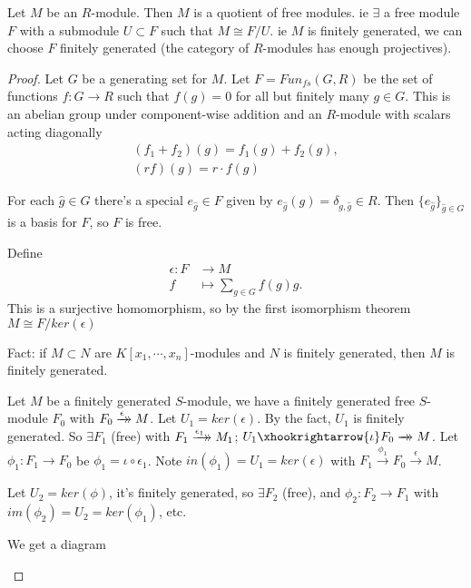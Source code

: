 \begin{proposition}
Let $M $ be an $R$-module. Then $M$ is a quotient of free modules. ie $\exists $ a free module $F$ with a submodule $U \subset F$ such that $M \cong F/U$. ie $M$ is finitely generated, we can choose $F$ finitely generated (the category of $R$-modules has enough projectives).
\end{proposition}

\begin{proof}
Let $G$ be a generating set for $M$. Let $F = Fun_{f s} (G,R)$ be the set of functions $f : G \to R$ such that $f(g) = 0$ for all but finitely many $g \in G$. This is an abelian group under component-wise addition and an $R $-module with scalars acting diagonally
\begin{align*}
    (f_1 + f_2 ) (g) = f_1(g) + f_2(g),\\
    (rf)(g) = r \cdot f(g)
\end{align*}

For each $\hat{g} \in G$ there's a special $e_{\hat{g}} \in F$ given by $e_{\hat{g}} ( g) = \delta_{{g, \hat{g}}} \in R$. Then $\{ e_{\hat{g}} \}_{\hat{g} \in G}$ is a basis for $F$, so $F$ is free.

Define 
\begin{align*}
    \epsilon : F &\to M\\
    f &\mapsto \sum_{g \in G} f(g) g.
\end{align*}
This is a surjective homomorphism, so by the first isomorphism theorem $M \cong F / ker(\epsilon)$

Fact: if $M \subset N$ are $K [ x_1, \cdots, x_n ] $-modules and $N  $ is finitely generated, then $M$ is finitely generated.

Let $M $ be a finitely generated $S$-module, we have a finitely generated free $S$-module $F_0$ with $F_0 \xrightarrow[]{\epsilon}\mathrel{\mkern-14mu}\rightarrow M $. Let $U_1 = ker (\epsilon)$. By the fact, $U_1$ is finitely generated. So $\exists F_1 $ (free) with $F_1 \xrightarrow[]{\epsilon_1}\mathrel{\mkern-14mu}\rightarrow M_1$; $U_1 \xhookrightarrow{\iota} F_0 \xrightarrowdbl{} M$. Let $\phi_1: F_1 \to F_0$ be $\phi_1 = \iota \circ \epsilon_1$. Note $in(\phi_1) = U_1 = ker(\epsilon)$ with $F_1 \xrightarrow{\phi_1} F_0 \xrightarrow{\epsilon}M$.

Let $U_2 = ker(\phi)$, it's finitely generated, so $\exists F_2$ (free), and $\phi_2 : F_2 \to F_1$ with $im (\phi_2) = U_2 = ker(\phi_1) $, etc.

We get a diagram
\begin{center}
\end{center}
\end{proof}

